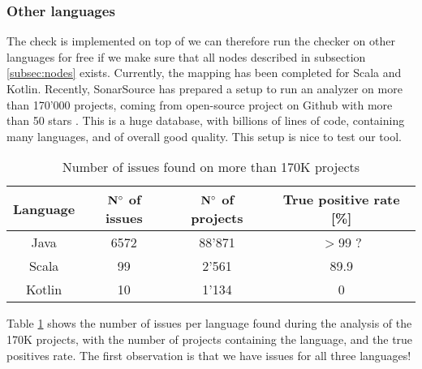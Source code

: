 \subsubsection{Other languages}
\label{subsubsec:other_languages}
The check is implemented on top of \slang{} we can therefore run the checker on other languages for free if we make sure that all nodes described in subsection \ref{subsec:nodes} exists. 
Currently, the mapping has been completed for Scala and Kotlin.
Recently, SonarSource has prepared a setup to run an analyzer on more than 170'000 projects, coming from open-source project on Github with more than 50 stars \cite{sourced:2019:Online}. 
This is a huge database, with billions of lines of code, containing many languages, and of overall good quality. 
This setup is nice to test our tool.

\begin{table}[h]
	\centering
	\caption{Number of issues found on more than 170K projects}
	\label{table:large_scale_issues}
	\begin{tabular}{|c|c|c|c|}
		\hline
		\bf Language & \bf $\bf N^{\circ}$ of issues & \bf $\bf N^{\circ}$  of projects & \bf True positive rate [\%] \\ \hline
		Java & 6572 & 88'871 & $>$99 ? \\
		Scala & 99 & 2'561 & 89.9 \\
		Kotlin & 10 & 1'134 & 0 \\ \hline
	\end{tabular}
\end{table}

Table \ref{table:large_scale_issues} shows the number of issues per language found during the analysis of the 170K projects, with the number of projects containing the language, and the true positives rate.
The first observation is that we have issues for all three languages!

